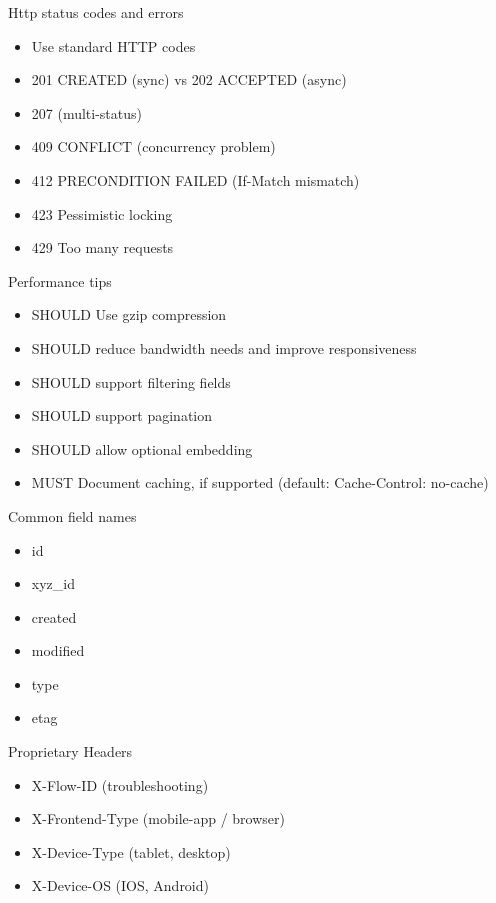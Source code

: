 \documentclass[10pt]{beamer}
\begin{document}
\begin{frame}{Http status codes and errors}

\begin{itemize}
\tightlist
\item
  Use standard HTTP codes
\item
  201 CREATED (sync) vs 202 ACCEPTED (async)
\item
  207 (multi-status)
\item
  409 CONFLICT (concurrency problem)
\item
  412 PRECONDITION FAILED (If-Match mismatch)
\item
  423 Pessimistic locking
\item
  429 Too many requests
\end{itemize}

\end{frame}

\begin{frame}{Performance tips}

\begin{itemize}
\tightlist
\item
  SHOULD Use gzip compression
\item
  SHOULD reduce bandwidth needs and improve responsiveness
\item
  SHOULD support filtering fields
\item
  SHOULD support pagination
\item
  SHOULD allow optional embedding
\item
  MUST Document caching, if supported (default: Cache-Control: no-cache)
\end{itemize}

\end{frame}

\begin{frame}{Common field names}

\begin{itemize}
\tightlist
\item
  id
\item
  xyz\_id
\item
  created
\item
  modified
\item
  type
\item
  etag
\end{itemize}

\end{frame}

\begin{frame}{Proprietary Headers}

\begin{itemize}
\tightlist
\item
  X-Flow-ID (troubleshooting)
\item
  X-Frontend-Type (mobile-app / browser)
\item
  X-Device-Type (tablet, desktop)
\item
  X-Device-OS (IOS, Android)
\end{itemize}

\end{frame}
\end{document}
